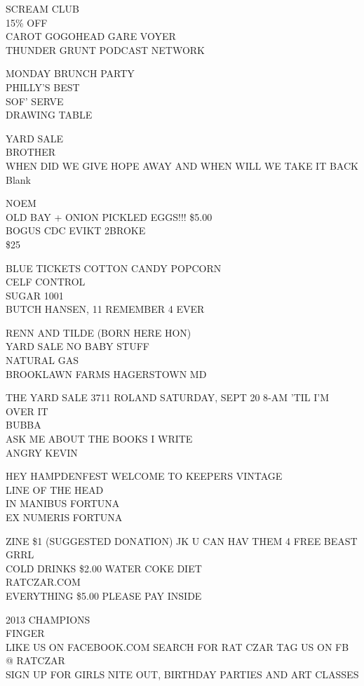 \documentclass[10pt,letterpaper]{article}
\begin{document}
SCREAM CLUB\\
15\% OFF\\
CAROT GOGOHEAD GARE VOYER\\
THUNDER GRUNT PODCAST NETWORK

MONDAY BRUNCH PARTY\\
PHILLY'S BEST\\
SOF' SERVE\\
DRAWING TABLE

YARD SALE\\
BROTHER\\
WHEN DID WE GIVE HOPE AWAY AND WHEN WILL WE TAKE IT BACK\\
Blank

NOEM\\
OLD BAY + ONION PICKLED EGGS!!! \$5.00\\
BOGUS CDC EVIKT 2BROKE\\
\$25

BLUE TICKETS COTTON CANDY POPCORN\\
CELF CONTROL\\
SUGAR 1001\\
BUTCH HANSEN, 11 REMEMBER 4 EVER

RENN AND TILDE (BORN HERE HON)\\
YARD SALE NO BABY STUFF\\
NATURAL GAS\\
BROOKLAWN FARMS HAGERSTOWN MD

THE YARD SALE 3711 ROLAND SATURDAY, SEPT 20 8{-}AM 'TIL I'M OVER IT\\
BUBBA\\
ASK ME ABOUT THE BOOKS I WRITE\\
ANGRY KEVIN

HEY HAMPDENFEST WELCOME TO KEEPERS VINTAGE\\
LINE OF THE HEAD\\
IN MANIBUS FORTUNA\\
EX NUMERIS FORTUNA

ZINE \$1 (SUGGESTED DONATION) JK U CAN HAV THEM 4 FREE BEAST GRRL\\
COLD DRINKS \$2.00 WATER COKE DIET\\
RATCZAR.COM\\
EVERYTHING \$5.00 PLEASE PAY INSIDE

2013 CHAMPIONS\\
FINGER\\
LIKE US ON FACEBOOK.COM SEARCH FOR RAT CZAR TAG US ON FB @ RATCZAR\\
SIGN UP FOR GIRLS NITE OUT, BIRTHDAY PARTIES AND ART CLASSES
\end{document}
